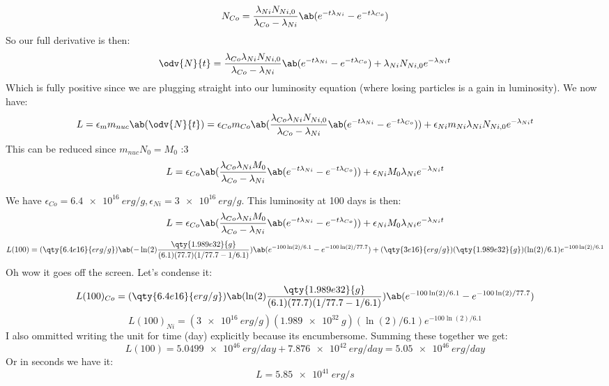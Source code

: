 \begin{equation}
    N_{Co} = \frac{\lambda_{Ni} N_{Ni,0}}{\lambda_{Co} - \lambda_{Ni}}\ab(e^{-t\lambda_{Ni}} - e^{-t\lambda_{Co}})
\end{equation}
So our full derivative is then:
\begin{equation}
    \odv{N}{t} = \frac{\lambda_{Co}\lambda_{Ni} N_{Ni,0}}{\lambda_{Co} - \lambda_{Ni}}\ab(e^{-t\lambda_{Ni}} - e^{-t\lambda_{Co}}) + \lambda_{Ni} N_{Ni,0} e^{-\lambda_{Ni} t}
\end{equation}
Which is fully positive since we are plugging straight into our luminosity equation (where losing particles is a gain in luminosity). We now have:
\begin{equation}
    L = \epsilon_m m_{nuc}\ab(\odv{N}{t}) = \epsilon_{Co}m_{Co}\ab(\frac{\lambda_{Co}\lambda_{Ni} N_{Ni,0}}{\lambda_{Co} - \lambda_{Ni}}\ab(e^{-t\lambda_{Ni}} - e^{-t\lambda_{Co}})) + \epsilon_{Ni}m_{Ni}\lambda_{Ni} N_{Ni,0} e^{-\lambda_{Ni} t}
\end{equation}
This can be reduced since $m_{nuc} N_0 = M_0$ :3
\begin{equation}
    L = \epsilon_{Co}\ab(\frac{\lambda_{Co}\lambda_{Ni} M_0}{\lambda_{Co} - \lambda_{Ni}}\ab(e^{-t\lambda_{Ni}} - e^{-t\lambda_{Co}})) + \epsilon_{Ni}M_0\lambda_{Ni} e^{-\lambda_{Ni} t}
\end{equation}

We have $\epsilon_{Co} = \qty{6.4e16}{erg/g}, \epsilon_{Ni} = \qty{3e16}{erg/g}$. This luminosity at 100 days is then:
\begin{equation}
    L = \epsilon_{Co}\ab(\frac{\lambda_{Co}\lambda_{Ni} M_0}{\lambda_{Co} - \lambda_{Ni}}\ab(e^{-t\lambda_{Ni}} - e^{-t\lambda_{Co}})) + \epsilon_{Ni}M_0\lambda_{Ni} e^{-\lambda_{Ni} t}
\end{equation}
\begin{equation}
    L(100) = (\qty{6.4e16}{erg/g})\ab(-\ln(2)\frac{\qty{1.989e32}{g}}{(6.1)(77.7)(1/77.7 - 1/6.1)})\ab(e^{-100\ln(2)/6.1} - e^{-100\ln(2)/77.7}) + (\qty{3e16}{erg/g})(\qty{1.989e32}{g})(\ln(2)/6.1)e^{-100\ln(2)/6.1}
\end{equation}
Oh wow it goes off the screen. Let's condense it:
\begin{equation}
    L(100)_{Co} = (\qty{6.4e16}{erg/g})\ab(\ln(2)\frac{\qty{1.989e32}{g}}{(6.1)(77.7)(1/77.7 - 1/6.1)})\ab(e^{-100\ln(2)/6.1} - e^{-100\ln(2)/77.7})
\end{equation}
\begin{equation}
    L(100)_{Ni} = (\qty{3e16}{erg/g})(\qty{1.989e32}{g})(\ln(2)/6.1)e^{-100\ln(2)/6.1}
\end{equation}
I also ommitted writing the unit for time (day) explicitly because its encumbersome. Summing these together we get:
\begin{equation}
    L(100) = \qty{5.0499e46}{erg/day} + \qty{7.876e42}{erg/day} = \boxed{\qty{5.05e46}{erg/day}}
\end{equation}
Or in seconds we have it:
\begin{equation}
    L = \qty{5.85e41}{erg/s}
\end{equation}
